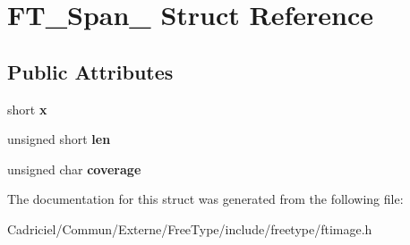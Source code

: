 \hypertarget{struct_f_t___span__}{}\section{F\+T\+\_\+\+Span\+\_\+ Struct Reference}
\label{struct_f_t___span__}
\subsection*{Public Attributes}
\begin{DoxyCompactItemize}
\item 
short {\bfseries x}\hypertarget{struct_f_t___span___a7f7235a404c66398b49c50fa09691ba5}{}\label{struct_f_t___span___a7f7235a404c66398b49c50fa09691ba5}

\item 
unsigned short {\bfseries len}\hypertarget{struct_f_t___span___a939c84317f25a97d0ba01704591a4d38}{}\label{struct_f_t___span___a939c84317f25a97d0ba01704591a4d38}

\item 
unsigned char {\bfseries coverage}\hypertarget{struct_f_t___span___a70f9c9e0e8d3f0b38adee03a508ae214}{}\label{struct_f_t___span___a70f9c9e0e8d3f0b38adee03a508ae214}

\end{DoxyCompactItemize}


The documentation for this struct was generated from the following file\+:\begin{DoxyCompactItemize}
\item 
Cadriciel/\+Commun/\+Externe/\+Free\+Type/include/freetype/ftimage.\+h\end{DoxyCompactItemize}

